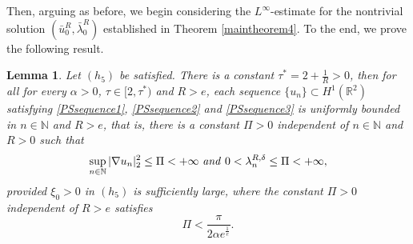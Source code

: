 \documentclass[11pt]{amsart}
\numberwithin{equation}{section}
\newtheorem{lemma}[theorem]{Lemma}
\theoremstyle{definition}
\newcommand{\R}{\mathbb{R}}
\begin{document}
Then, arguing as before, we begin considering the $L^\infty$-estimate for the nontrivial solution $(\bar{u}_0^R,\bar{\lambda}_0^R)$
established in Theorem \ref{maintheorem4}. To the end,
we prove the following result.

\begin{lemma}\label{20bounded}
Let $(h_5)$ be satisfied.
 There is a constant
 $\tau^*=2+\frac{1}{R}>0$, then for all for every $\alpha>0$, $\tau\in[2,\tau^*)$ and $R>e$,
each sequence $\{u_n\}\subset H^1(\R^2)$ satisfying \eqref{PSsequence1}, \eqref{PSsequence2} and \eqref{PSsequence3} is uniformly bounded in $n\in \mathbb{N}$
and $R>e$, that is,
there is a constant $\Pi>0$ independent of $n\in \mathbb{N}$ and $R>0$ such that
\begin{equation}\label{20bounded01}
\sup_{n\in \mathbb{N}} |\nabla u_n |_{2}^2\leq\Pi<+\infty~\text{\emph{and}}~0<\lambda_n^{R,\delta}\leq \Pi<+\infty,
\end{equation}
provided $\xi_0>0$ in $(h_5)$ is sufficiently large,
where the constant $\Pi>0$ independent of $R>e$ satisfies
\begin{equation}\label{20bounded00}
 \Pi<\frac{\pi}{2\alpha e^{\frac1e}}.
\end{equation}
\end{lemma}
\end{document}
